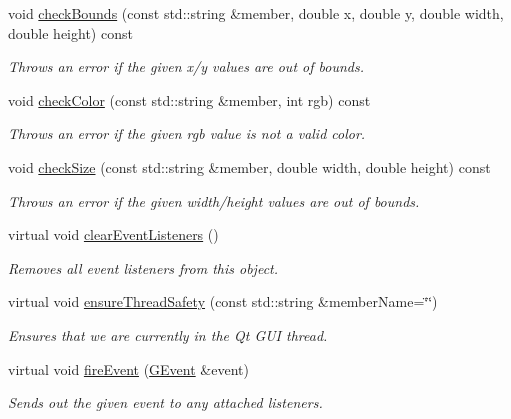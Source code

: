 \begin{DoxyCompactItemize}
\item 
void \mbox{\hyperlink{classGDrawingSurface_a3a690bcb2d62250c9e4722ad7c1b9ab6}{check\+Bounds}} (const std\+::string \&member, double x, double y, double width, double height) const
\begin{DoxyCompactList}\small\item\em Throws an error if the given x/y values are out of bounds. \end{DoxyCompactList}\item 
void \mbox{\hyperlink{classGDrawingSurface_a9841b5dc607ca41a14819d80e1d8a09c}{check\+Color}} (const std\+::string \&member, int rgb) const
\begin{DoxyCompactList}\small\item\em Throws an error if the given rgb value is not a valid color. \end{DoxyCompactList}\item 
void \mbox{\hyperlink{classGDrawingSurface_a70a6546707ae708573396616bd0f5320}{check\+Size}} (const std\+::string \&member, double width, double height) const
\begin{DoxyCompactList}\small\item\em Throws an error if the given width/height values are out of bounds. \end{DoxyCompactList}\item 
virtual void \mbox{\hyperlink{classGObservable_a80cfa040459ff53594adbd6a51ec8f43}{clear\+Event\+Listeners}} ()
\begin{DoxyCompactList}\small\item\em Removes all event listeners from this object. \end{DoxyCompactList}\item 
virtual void \mbox{\hyperlink{classGObservable_a284f31528c0520f8e545c03ac9eeac74}{ensure\+Thread\+Safety}} (const std\+::string \&member\+Name=\char`\"{}\char`\"{})
\begin{DoxyCompactList}\small\item\em Ensures that we are currently in the Qt G\+UI thread. \end{DoxyCompactList}\item 
virtual void \mbox{\hyperlink{classGObservable_a63e5e5a6227c59c928493b11aceb0f67}{fire\+Event}} (\mbox{\hyperlink{classGEvent}{G\+Event}} \&event)
\begin{DoxyCompactList}\small\item\em Sends out the given event to any attached listeners. \end{DoxyCompactList}\item 

\end{DoxyCompactItemize}
